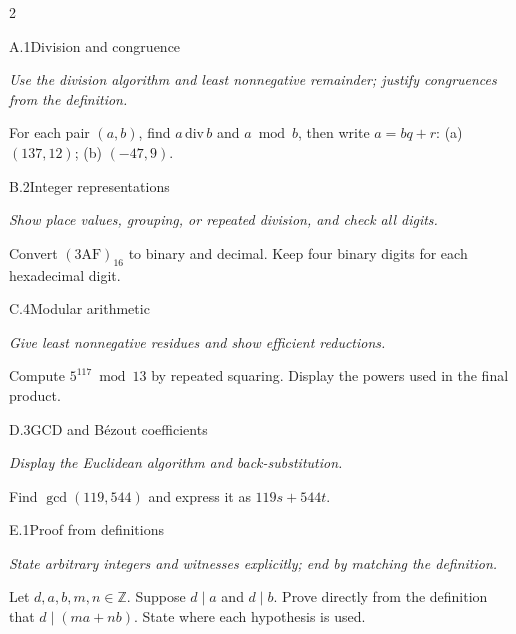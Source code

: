 \documentclass[9pt]{extarticle}
\begin{document}
\begin{multicols}{2}
\begin{CoreProblem}{A.1}{Division and congruence}
{\scriptsize\textit{Use the division algorithm and least nonnegative remainder; justify congruences from the definition.}\par}
For each pair $(a,b)$, find $a\,\mathrm{div}\,b$ and $a\bmod b$, then write
$a=bq+r$: (a) $(137,12)$; (b) $(-47,9)$.
\end{CoreProblem}
\begin{CoreProblem}{B.2}{Integer representations}
{\scriptsize\textit{Show place values, grouping, or repeated division, and check all digits.}\par}
Convert $(\mathrm{3AF})_{16}$ to binary and decimal. Keep four binary digits
for each hexadecimal digit.
\end{CoreProblem}
\begin{CoreProblem}{C.4}{Modular arithmetic}
{\scriptsize\textit{Give least nonnegative residues and show efficient reductions.}\par}
Compute $5^{117}\bmod13$ by repeated squaring. Display the powers used in the
final product.
\end{CoreProblem}
\columnbreak
\begin{CoreProblem}{D.3}{GCD and B\'ezout coefficients}
{\scriptsize\textit{Display the Euclidean algorithm and back-substitution.}\par}
Find $\gcd(119,544)$ and express it as $119s+544t$.
\end{CoreProblem}
\begin{CoreProblem}{E.1}{Proof from definitions}
{\scriptsize\textit{State arbitrary integers and witnesses explicitly; end by matching the definition.}\par}
Let $d,a,b,m,n\in\mathbb Z$. Suppose $d\mid a$ and $d\mid b$. Prove directly
from the definition that $d\mid(ma+nb)$. State where each hypothesis is used.
\end{CoreProblem}
\end{multicols}
\CoreWorkArea
\FormBreak
{}
\end{document}
